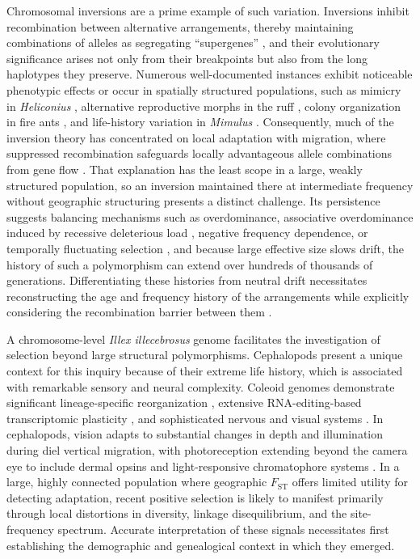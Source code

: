 \documentclass[11pt]{article}
\newcommand{\illex}{\textit{Illex illecebrosus}}
\newcommand{\Fst}{F_\mathrm{ST}}
\begin{document}
Chromosomal inversions are a prime example of such variation. Inversions inhibit recombination between alternative arrangements, thereby maintaining combinations of alleles as segregating ``supergenes'' \citep{kirkpatrick2010,schwander2014,thompson2014,wellenreuther2018,faria2019}, and their evolutionary significance arises not only from their breakpoints but also from the long haplotypes they preserve. Numerous well-documented instances exhibit noticeable phenotypic effects or occur in spatially structured populations, such as mimicry in \textit{Heliconius} \citep{jay2021}, alternative reproductive morphs in the ruff \citep{lamichhaney2016}, colony organization in fire ants \citep{wang2013}, and life-history variation in \textit{Mimulus} \citep{lowry2010}. Consequently, much of the inversion theory has concentrated on local adaptation with migration, where suppressed recombination safeguards locally advantageous allele combinations from gene flow \citep{kirkpatrick2006,charlesworth2018inv}. That explanation has the least scope in a large, weakly structured population, so an inversion maintained there at intermediate frequency without geographic structuring presents a distinct challenge. Its persistence suggests balancing mechanisms such as overdominance, associative overdominance induced by recessive deleterious load \citep{zhao2016,gilbert2020,jay2021}, negative frequency dependence, or temporally fluctuating selection \citep{wittmann2017,rudman2022}, and because large effective size slows drift, the history of such a polymorphism can extend over hundreds of thousands of generations. Differentiating these histories from neutral drift necessitates reconstructing the age and frequency history of the arrangements while explicitly considering the recombination barrier between them \citep{navarro2000,guerrero2012,berdan2023}.

A chromosome-level \illex{} genome facilitates the investigation of selection beyond large structural polymorphisms. Cephalopods present a unique context for this inquiry because of their extreme life history, which is associated with remarkable sensory and neural complexity. Coleoid genomes demonstrate significant lineage-specific reorganization \citep{schmidbaur2022}, extensive RNA-editing-based transcriptomic plasticity \citep{liscovitch2017}, and sophisticated nervous and visual systems \citep{albertin2015,albertin2022,styfhals2022,songcocasey2022}. In cephalopods, vision adapts to substantial changes in depth and illumination during diel vertical migration, with photoreception extending beyond the camera eye to include dermal opsins and light-responsive chromatophore systems \citep{mathger2010,ramirez2015,kingston2015}. In a large, highly connected population where geographic $\Fst$ offers limited utility for detecting adaptation, recent positive selection is likely to manifest primarily through local distortions in diversity, linkage disequilibrium, and the site-frequency spectrum. Accurate interpretation of these signals necessitates first establishing the demographic and genealogical context in which they emerged.
\end{document}
